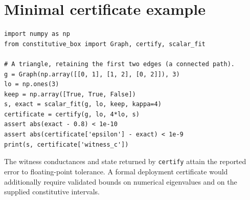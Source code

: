 \documentclass[11pt]{article}
\begin{document}
\section{Minimal certificate example}
\begin{lstlisting}
import numpy as np
from constitutive_box import Graph, certify, scalar_fit

# A triangle, retaining the first two edges (a connected path).
g = Graph(np.array([[0, 1], [1, 2], [0, 2]]), 3)
lo = np.ones(3)
keep = np.array([True, True, False])
s, exact = scalar_fit(g, lo, keep, kappa=4)
certificate = certify(g, lo, 4*lo, s)
assert abs(exact - 0.8) < 1e-10
assert abs(certificate['epsilon'] - exact) < 1e-9
print(s, certificate['witness_c'])
\end{lstlisting}
The witness conductances and state returned by \texttt{certify} attain the reported error to floating-point tolerance. A formal deployment certificate would additionally require validated bounds on numerical eigenvalues and on the supplied constitutive intervals.
\end{document}
